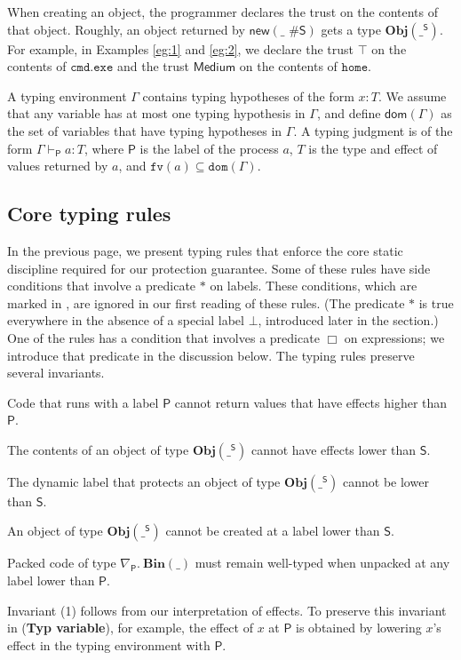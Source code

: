 \documentclass{sigplanconf}
\newcommand{\labp}{\mathsf P}
\newcommand{\labb}{\mathsf S}
\newcommand{\fv}{\mathtt{fv}}
\newcommand{\trule}[1]{(\textbf{Typ #1})}
\newcommand{\dom}{\mathtt{dom}}
\newcounter{compactenumc}
\newenvironment{compactenum3}
        {\begin{list}{(\arabic{compactenumc})}{
        \usecounter{compactenumc}
\setlength{\leftmargin}{6mm}
        \setlength{\labelwidth}{\leftmargin}
        }}
        {\end{list}}
\begin{document}
When creating an object, the programmer declares the trust on the contents of that object. 
Roughly, an object returned by $\mathsf{new}(\_\mbox{ \# }\labb)$ gets a type $\mathbf{Obj}(\_^{\labb})$.
For example, in Examples \ref{eg:1} and \ref{eg:2}, we declare the trust $\top$ on the contents of $\mathtt{cmd.exe}$ and the trust $\mathsf{Medium}$ on the contents of $\mathtt{home}$.

A typing environment $\Gamma$ contains 
typing hypotheses of the form $x : T$. We assume that any variable has at most one typing hypothesis in $\Gamma$, and define $\mathsf{dom}(\Gamma)$ as the set of variables that have
typing hypotheses in $\Gamma$. 
A typing judgment is of the
form $\Gamma \vdash_{\labp} a : T$, where $\labp$ is the label of the process $a$, $T$ is the type and effect of values returned by $a$, and  $\fv(a) \subseteq \dom(\Gamma)$.


\subsection{Core typing rules}\label{core}




In the previous page, we present typing rules that enforce the core static discipline required for our protection guarantee. Some of these rules have side conditions that involve a predicate $\ast$ on labels. These conditions, which are marked in , are ignored in our first reading of these rules. (The predicate $\ast$ is true everywhere in the absence of a special label $\bot$, introduced later in the section.) One of the rules has a condition that involves a predicate $\Box$ on expressions; we introduce that predicate in the discussion below.
The typing rules preserve several invariants.
\begin{compactenum3}
\item Code that runs with a label $\labp$ cannot return values that have effects higher than $\labp$.
\item The contents of an object of type $\mathbf{Obj}(\_^{\labb})$ cannot have effects lower than $\labb$. 
\item The dynamic label that protects an object of type $\mathbf{Obj}(\_^{\labb})$ cannot be lower than $\labb$. 
\item An object of type $\mathbf{Obj}(\_^{\labb})$ cannot be created at a label lower than $\labb$. \item Packed code of type $\nabla_{\labp}.~\mathbf{Bin}(\_)$ must remain well-typed when unpacked at any label lower than $\labp$.
\end{compactenum3}
Invariant (1) follows from our interpretation of effects. To preserve this invariant in \trule{variable}, for example, the effect of $x$ at $\labp$ is obtained by lowering $x$'s effect in the typing environment with $\labp$.
\end{document}
